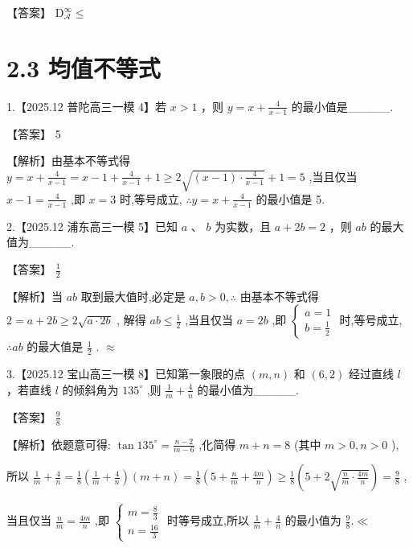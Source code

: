 \documentclass[10pt]{article}
\begin{document}
【答案】 \({\mathrm{D}}_{\mathcal{A}}^{\infty } \leq\)

\section*{2.3 均值不等式}

1.【2025.12 普陀高三一模 4】若 \(x > 1\) ，则 \(y = x + \frac{4}{x - 1}\) 的最小值是\_\_\_\_\_.

【答案】 5

【解析】由基本不等式得 \(y = x + \frac{4}{x - 1} = x - 1 + \frac{4}{x - 1} + 1 \geq  2\sqrt{\left( {x - 1}\right)  \cdot  \frac{4}{x - 1}} + 1 = 5\) ,当且仅当 \(x - 1 = \frac{4}{x - 1}\) ,即 \(x = 3\) 时,等号成立, \(\therefore y = x + \frac{4}{x - 1}\) 的最小值是 5.

2.【2025.12 浦东高三一模 5】已知 \(a\text{ 、 }b\) 为实数，且 \(a + {2b} = 2\) ，则 \({ab}\) 的最大值为\_\_\_\_\_.

【答案】 \(\frac{1}{2}\)

【解析】当 \({ab}\) 取到最大值时,必定是 \(a,b > 0,\therefore\) 由基本不等式得 \(2 = a + {2b} \geq  2\sqrt{a \cdot  {2b}}\) , 解得 \({ab} \leq  \frac{1}{2}\) ,当且仅当 \(a = {2b}\) ,即 \(\left\{  \begin{array}{l} a = 1 \\  b = \frac{1}{2} \end{array}\right.\) 时,等号成立, \(\therefore {ab}\) 的最大值是 \(\frac{1}{2}\) . \(\approx\)

3.【2025.12 宝山高三一模 8】已知第一象限的点 \(\left( {m,n}\right)\) 和 \(\left( {6,2}\right)\) 经过直线 \(l\) ，若直线 \(l\) 的倾斜角为 \({135}^{ \circ  }\) ,则 \(\frac{1}{m} + \frac{4}{n}\) 的最小值为\_\_\_\_\_.

【答案】 \(\frac{9}{8}\)

【解析】依题意可得: \(\tan {135}^{ \circ  } = \frac{n - 2}{m - 6}\) ,化简得 \(m + n = 8\) (其中 \(m > 0,n > 0\) ),

所以 \(\frac{1}{m} + \frac{4}{n} = \frac{1}{8}\left( {\frac{1}{m} + \frac{4}{n}}\right) \left( {m + n}\right)  = \frac{1}{8}\left( {5 + \frac{n}{m} + \frac{4m}{n}}\right)  \geq  \frac{1}{8}\left( {5 + 2\sqrt{\frac{n}{m} \cdot  \frac{4m}{n}}}\right)  = \frac{9}{8}\) ,

当且仅当 \(\frac{n}{m} = \frac{4m}{n}\) ,即 \(\left\{  \begin{array}{l} m = \frac{8}{3} \\  n = \frac{16}{3} \end{array}\right.\) 时等号成立,所以 \(\frac{1}{m} + \frac{4}{n}\) 的最小值为 \(\frac{9}{8}. \ll\)
\end{document}
